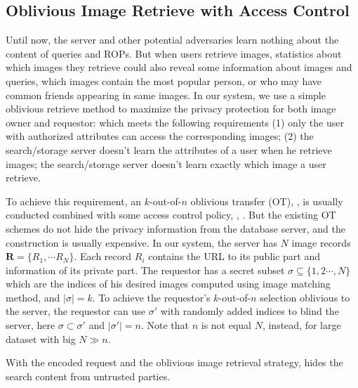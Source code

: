 {\subsection{Oblivious Image Retrieve with Access Control}

Until now,
 the server and other potential adversaries learn nothing
 about the content of queries and ROPs.
But when users retrieve images,
 statistics about which images they retrieve could also reveal
 some information about images and queries, \eg which images contain
 the most popular person,
 or who may have common friends appearing in same images.
In our system, we use a simple oblivious retrieve method
 to maximize the privacy protection for both image owner and requestor:
 which meets the following requirements
 (1) only the user with authorized attributes can access the corresponding images;
 (2) the search/storage server doesn't learn the attributes of a user when he retrieve images;
the search/storage server doesn't learn exactly which image a user
 retrieve.

To achieve this requirement,
 an $k$-out-of-$n$ oblivious transfer (OT), \eg,\cite{camenisch2007simulatable}
 is usually conducted combined with some access control policy, \eg,
 \cite{camenisch2007simulatable, camenisch2009oblivious}.
But the existing OT schemes do not hide the privacy information from the database server,
 and the construction is usually expensive.
In our system,
 the server has $N$ image records $\mathbf{R}=\{R_1, \cdots R_N\}$.
Each record $R_i$ contains the URL to its public part
 and information of its private part.
The requestor has a secret  subset $\sigma \subseteq \{1,2 \cdots,N\}$
  which are the indices of his desired images computed using image
  matching method, and $|\sigma| = k$.
To achieve the requestor's $k$-out-of-$n$ selection oblivious to the server,
 the requestor can use $\sigma'$ with randomly added indices to blind the server,
 here $\sigma \subset \sigma'$ and $|\sigma'|=n$.
Note that $n$ is not equal $N$,
 instead, for large dataset with big $N \gg n$.

With the encoded request and the oblivious image retrieval strategy,
 \ourprotocol hides the search content from untrusted parties.
}


